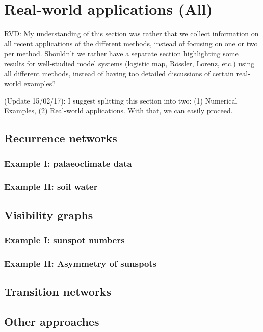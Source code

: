 \section{Real-world applications {\bf{(All)}}}

RVD: My understanding of this section was rather that we collect information on all recent applications of the different methods, instead of focusing on one or two per method. Shouldn't we rather have a separate section highlighting some results for well-studied model systems (logistic map, R\"ossler, Lorenz, etc.) using all different methods, instead of having too detailed discussions of certain real-world examples?

(Update 15/02/17): I suggest splitting this section into two: (1) Numerical Examples, (2) Real-world applications. With that, we can easily proceed.

\subsection{Recurrence networks}
		\subsubsection{Example I: palaeoclimate data}
		\subsubsection{Example II: soil water }

	\subsection{Visibility graphs}
		\subsubsection{Example I: sunspot numbers}
		\subsubsection{Example II: Asymmetry of sunspots}

	\subsection{Transition networks}
	\subsection{Other approaches}

